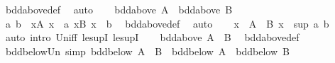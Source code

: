 \begin{isabellebody}
\ bdd{\isacharunderscore}{\kern0pt}above{\isacharunderscore}{\kern0pt}def\ \isamarkupfalse%
\ auto\isanewline
{}\isamarkupfalse%
\isanewline
\ \ \isamarkupfalse%
\ {\isachardoublequoteopen}bdd{\isacharunderscore}{\kern0pt}above\ A\ {\isasymand}\ bdd{\isacharunderscore}{\kern0pt}above\ B{\isachardoublequoteclose}\isanewline
\ \ \isamarkupfalse%
\ \isamarkupfalse%
\ a\ b\ \ {\isachardoublequoteopen}{\isasymforall}x{\isasymin}A{\isachardot}{\kern0pt}\ x\ {\isasymle}\ a{\isachardoublequoteclose}\ {\isachardoublequoteopen}{\isasymforall}x{\isasymin}B{\isachardot}{\kern0pt}\ x\ {\isasymle}\ b{\isachardoublequoteclose}\ \isamarkupfalse%
\ bdd{\isacharunderscore}{\kern0pt}above{\isacharunderscore}{\kern0pt}def\ \isamarkupfalse%
\ auto\isanewline
\ \ \isamarkupfalse%
\ {\isachardoublequoteopen}{\isasymforall}x\ {\isasymin}\ A\ {\isasymunion}\ B{\isachardot}{\kern0pt}\ x\ {\isasymle}\ sup\ a\ b{\isachardoublequoteclose}\ \isamarkupfalse%
\ {\isacharparenleft}{\kern0pt}auto\ intro{\isacharcolon}{\kern0pt}\ Un{\isacharunderscore}{\kern0pt}iff\ le{\isacharunderscore}{\kern0pt}supI{}\ le{\isacharunderscore}{\kern0pt}supI{}{\isacharparenright}{\kern0pt}\isanewline
\ \ \isamarkupfalse%
\ {\isachardoublequoteopen}bdd{\isacharunderscore}{\kern0pt}above\ {\isacharparenleft}{\kern0pt}A\ {\isasymunion}\ B{\isacharparenright}{\kern0pt}{\isachardoublequoteclose}\ \isamarkupfalse%
\ bdd{\isacharunderscore}{\kern0pt}above{\isacharunderscore}{\kern0pt}def\ \isacommand{{\isachardot}{\kern0pt}{\isachardot}{\kern0pt}}\isamarkupfalse%
\isanewline
{}\isamarkupfalse%
%
\endisatagproof
{\isafoldproof}%
%
\isadelimproof
\isanewline
%
\endisadelimproof
\isanewline
{}\isamarkupfalse%
\ bdd{\isacharunderscore}{\kern0pt}below{\isacharunderscore}{\kern0pt}Un\ {\isacharbrackleft}{\kern0pt}simp{\isacharbrackright}{\kern0pt}{\isacharcolon}{\kern0pt}\ {\isachardoublequoteopen}bdd{\isacharunderscore}{\kern0pt}below\ {\isacharparenleft}{\kern0pt}A\ {\isasymunion}\ B{\isacharparenright}{\kern0pt}\ {\isacharequal}{\kern0pt}\ {\isacharparenleft}{\kern0pt}bdd{\isacharunderscore}{\kern0pt}below\ A\ {\isasymand}\ bdd{\isacharunderscore}{\kern0pt}below\ B{\isacharparenright}{\kern0pt}{\isachardoublequoteclose}\isanewline
%
\isadelimproof
%
\endisadelimproof
%
\isatagproof
{}\isamarkupfalse%
\isanewline
\ \ \isamarkupfalse%

\end{isabellebody}

